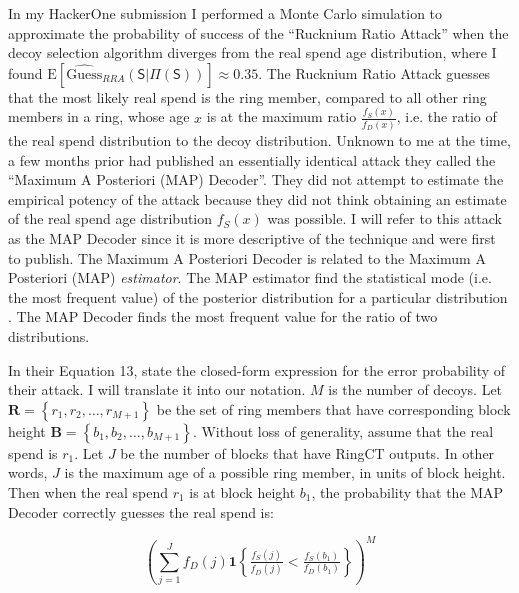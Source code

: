 \documentclass[english]{article}
\begin{document}
In my HackerOne submission I performed a Monte Carlo simulation to
approximate the probability of success of the ``Rucknium Ratio Attack''
when the decoy selection algorithm diverges from the real spend age
distribution, where I found $\mathrm{E}\left[\mathrm{\widehat{Guess}}_{RRA}\left(\mathsf{S}|\Pi(\mathsf{S})\right)\right]\approx0.35$.
The Rucknium Ratio Attack guesses that the most likely real spend
is the ring member, compared to all other ring members in a ring,
whose age $x$ is at the maximum ratio $\tfrac{f_{S}\left(x\right)}{f_{D}\left(x\right)}$,
i.e. the ratio of the real spend distribution to the decoy distribution.
Unknown to me at the time, a few months prior \cite{Aeeneh2021} had
published an essentially identical attack they called the ``Maximum
A Posteriori (MAP) Decoder''. They did not attempt to estimate the
empirical potency of the attack because they did not think obtaining
an estimate of the real spend age distribution $f_{S}(x)$ was possible.
I will refer to this attack as the MAP Decoder since it is more descriptive
of the technique and \cite{Aeeneh2021} were first to publish. The
Maximum A Posteriori Decoder is related to the Maximum A Posteriori
(MAP) \textit{estimator}. The MAP estimator find the statistical mode
(i.e. the most frequent value) of the posterior distribution for a
particular distribution \cite{Bassett2019}. The MAP Decoder finds
the most frequent value for the ratio of two distributions.

In their Equation 13, \cite{Aeeneh2021} state the closed-form expression
for the error probability of their attack. I will translate it into
our notation. $M$ is the number of decoys. Let $\boldsymbol{R}=\left\{ r_{1},r_{2},\dots,r_{M+1}\right\} $
be the set of ring members that have corresponding block height $\boldsymbol{B}=\left\{ b_{1},b_{2},\dots,b_{M+1}\right\} $.
Without loss of generality, assume that the real spend is $r_{1}$.
Let $J$ be the number of blocks that have RingCT outputs. In other
words, $J$ is the maximum age of a possible ring member, in units
of block height. Then when the real spend $r_{1}$ is at block height
$b_{1}$, the probability that the MAP Decoder correctly guesses the
real spend is:

\begin{equation}
\left(\sum_{j=1}^{J}f_{D}\left(j\right)\mathbf{1}\left\{ \tfrac{f_{S}\left(j\right)}{f_{D}\left(j\right)}<\tfrac{f_{S}\left(b_{1}\right)}{f_{D}\left(b_{1}\right)}\right\} \right)^{M}\label{eq:MAP-Decoder-Success-Single-Ring}
\end{equation}
\end{document}
